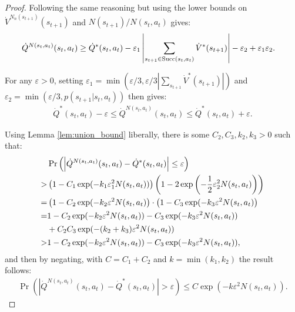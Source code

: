 \documentclass{article}
\newcommand{\succc}[2]{\textnormal{Succ}(#1,#2)}
\theoremstyle{plain}
\begin{document}
\begin{appendices}
\begin{proof}
            Following the same reasoning but using the lower bounds on $\dot{V}^{N_n(s_{t+1})}(s_{t+1})$ and $N(s_{t+1})/N(s_t,a_t)$ gives:
            \begin{align}
                \dot{Q}^{N(s_t,a_t)}(s_t,a_t) 
                    &\geq \dot{Q}^*(s_t,a_t) 
                        - \varepsilon_1\left|\sum_{s_{t+1}\in\succc{s_t}{a_t}} \dot{V}^*(s_{t+1})\right| 
                        - \varepsilon_2 
                        + \varepsilon_1 \varepsilon_2.
            \end{align}
            
            For any $\varepsilon >0$, setting $\varepsilon_1 = \min(\varepsilon/3, \varepsilon/3|\sum_{s_{t+1}} \dot{V}^*(s_{t+1})|)$ and $\varepsilon_2 = \min( \varepsilon/3, p(s_{t+1}|s_t,a_t))$ then gives:
            \begin{align}
                \dot{Q}^*(s_t,a_t) - \varepsilon \leq \dot{Q}^{N(s_t,a_t)}(s_t,a_t) \leq \dot{Q}^*(s_t,a_t) + \varepsilon.
            \end{align}
            
            Using Lemma \ref{lem:union_bound} liberally, there is some $C_2,C_3,k_2,k_3>0$ such that:
            \begin{align}
                &\Pr\left(\left| \dot{Q}^{N(s_t,a_t)}(s_t,a_t) - \dot{Q}^*(s_t,a_t) \right| \leq \varepsilon \right) \\
                    >& \left(1-C_1\exp(-k_1\varepsilon_1^2 N(s_t,a_t))\right) \left(1-2\exp\left(-\frac{1}{2}\varepsilon_2^2 N(s_t,a_t) \right)\right) \\
                    =& \left(1-C_2\exp(-k_2 \varepsilon^2 N(s_t,a_t) \right) \cdot \left(1-C_3\exp(-k_3 \varepsilon^2 N(s_t,a_t)\right) \\
                    =& 1 -C_2\exp(-k_2 \varepsilon^2 N(s_t,a_t)) -C_3\exp(-k_3 \varepsilon^2 N(s_t,a_t)) \notag \\
                        &+ C_2C_3\exp(-(k_2+k_3)\varepsilon^2 N(s_t,a_t) ) \\
                    >& 1 -C_2\exp(-k_2 \varepsilon^2 N(s_t,a_t)) -C_3\exp(-k_3 \varepsilon^2 N(s_t,a_t)),
            \end{align}
            and then by negating, with $C=C_1+C_2$ and $k=\min(k_1,k_2)$ the result follows:
            \begin{align}
                    \Pr\left(\left| \dot{Q}^{N(s_t,a_t)}(s_t,a_t) - \dot{Q}^*(s_t,a_t) \right| > \varepsilon \right) \leq C\exp(-k\varepsilon^2 N(s_t,a_t)).
            \end{align}
        \end{proof}
    

\end{appendices}
\end{document}
